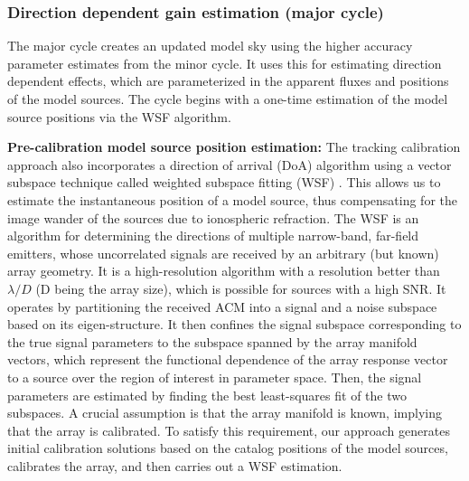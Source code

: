 \documentclass[referee]{aa}
\begin{document}
\subsubsection{\label{sub:Direction-dependent-gain}Direction dependent gain estimation (major cycle)}  

The major cycle creates an updated model sky using the higher accuracy parameter
estimates from the minor cycle.  It uses this for estimating direction dependent
effects, which  are parameterized  in the apparent  fluxes and positions  of the
model sources. The  cycle begins with a one-time estimation  of the model source
positions via the WSF algorithm.


\textbf{Pre-calibration   model  source   position  estimation:}   The  tracking
calibration approach  also incorporates a  direction of arrival  (DoA) algorithm
using  a  vector  subspace  technique  called weighted  subspace  fitting  (WSF)
\citep{viberg1991detection}.   This  allows  us  to estimate  the  instantaneous
position  of a  model source,  thus  compensating for  the image  wander of  the
sources due to  ionospheric refraction. The WSF is  an algorithm for determining
the directions  of multiple narrow-band, far-field  emitters, whose uncorrelated
signals  are received  by an  arbitrary  (but known)  array geometry.   It is  a
\mbox{high-resolution} algorithm  with a  resolution better than  $\lambda/D$ (D
being  the array  size),  which is  possible for  sources  with a  high SNR.  It
operates by  partitioning the received  ACM into a  signal and a  noise subspace
based   on  its  eigen-structure.    It  then   confines  the   signal  subspace
corresponding to the true signal parameters to the subspace spanned by the array
manifold  vectors,  which  represent  the  functional dependence  of  the  array
response vector  to a  source over  the region of  interest in  parameter space.
Then, the signal parameters are  estimated by finding the best least-squares fit
of the two subspaces. A crucial  assumption is that the array manifold is known,
implying  that  the array  is  calibrated.   To  satisfy this  requirement,  our
approach generates initial calibration  solutions based on the catalog positions
of  the  model  sources,  calibrates  the  array, and  then  carries  out  a  WSF
estimation.

\end{document}
